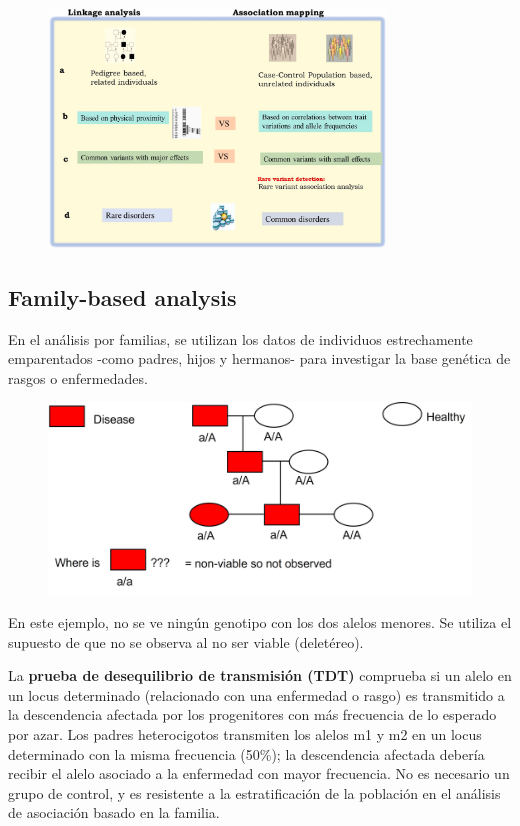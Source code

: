 \begin{figure}[htbp]
\centering
\includegraphics[width = 0.8\textwidth]{figs/Imagen3.jpg}
\end{figure}

\subsection{Family-based analysis}
En el análisis por familias, se utilizan los datos de individuos estrechamente emparentados -como padres, hijos y hermanos- para investigar la base genética de rasgos o enfermedades.

\begin{figure}[htbp]
\centering
\includegraphics[width =0.8 \textwidth]{figs/Imagen4.jpg}
\end{figure}

En este ejemplo, no se ve ningún genotipo con los dos alelos menores. Se utiliza el supuesto de que no se observa al no ser viable (deletéreo). 

La \textbf{prueba de desequilibrio de transmisión (TDT)} comprueba si un alelo en un locus determinado (relacionado con una enfermedad o rasgo) es transmitido a la descendencia afectada por los progenitores con más frecuencia de lo esperado por azar. Los padres heterocigotos transmiten los alelos m1 y m2 en un locus determinado con la misma frecuencia (50\%); la descendencia afectada debería recibir el alelo asociado a la enfermedad con mayor frecuencia. No es necesario un grupo de control, y es resistente a la estratificación de la población en el análisis de asociación basado en la familia.

